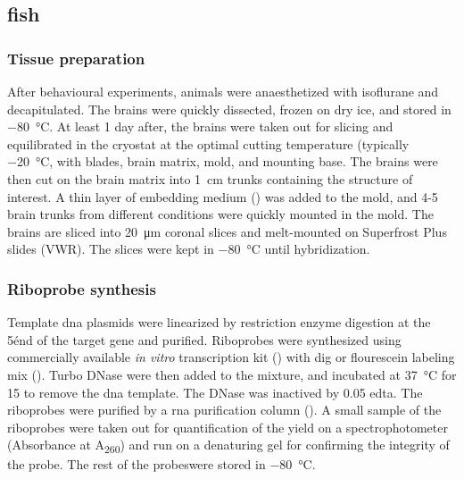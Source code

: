 \subsection{\Acrlong{fish}}
\subsubsection{Tissue preparation}
After behavioural experiments, animals were anaesthetized with isoflurane and decapitulated. The brains were quickly dissected, frozen on dry ice, and stored in \SI{-80}{\celsius}. At least 1 day after, the brains were taken out for slicing and equilibrated in the cryostat at the optimal cutting temperature (typically \SI{-20}{\celsius}, with blades, brain matrix, mold, and mounting base. The brains were then cut on the brain matrix into \SI{1}{\cm} trunks containing the structure of interest. A thin layer of embedding medium () was added to the mold, and 4-5 brain trunks from different conditions were quickly mounted in the mold. The brains are sliced into \SI{20}{\um} coronal slices and melt-mounted on Superfrost Plus slides (VWR). The slices were kept in \SI{-80}{\celsius} until hybridization.

\subsubsection{Riboprobe synthesis}
Template \gls{dna} plasmids were linearized by restriction enzyme digestion at the 5\' end of the target gene and purified. Riboprobes were synthesized using commercially available \textit{in vitro} transcription kit () with \gls{dig} or flourescein labeling mix (). Turbo DNase were then added to the mixture, and incubated at \SI{37}{\celsius} for \SI{15}{\min} to remove the \gls{dna} template. The DNase was inactived by \SI{0.05}{\Molar} \gls{edta}. The riboprobes were purified by a \gls{rna} purification column (). A small sample of the riboprobes were taken out for quantification of the yield on a spectrophotometer (Absorbance at A\textsubscript{260}) and run on a denaturing gel for confirming the integrity of the probe. The rest of the probeswere stored in \SI{-80}{\celsius}.


